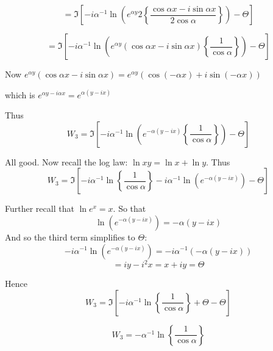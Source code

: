 \documentclass{article}
\begin{document}
  \[ = \Im \left[  
 - i \alpha^{-1} \ln \left(
  e^{\alpha y} 2 \left\{ \frac{\cos \alpha x - i \sin \alpha x }{2 \cos \alpha} \right\} \right) 
  - \Theta  \right] \]

\[ = \Im \left[  
 - i \alpha^{-1} \ln \left(
  e^{\alpha y}( \cos \alpha x - i \sin \alpha x  )  \left\{ \frac{1}{\cos \alpha} \right\} \right) 
  - \Theta  \right] \]

Now $ e^{\alpha y}( \cos \alpha x - i \sin \alpha x  ) = 
e^{\alpha y}( \cos(- \alpha x) + i \sin(- \alpha x)  )$ 

which is $e^{\alpha y - i \alpha x} = e^{ \alpha (y - ix)}$

Thus
\[ W_{3} = \Im \left[  
 - i \alpha^{-1} \ln \left(
  e^{ - \alpha (y - ix)}  \left\{ \frac{1}{\cos \alpha} \right\} \right) 
  - \Theta  \right] \]
  
All good.  Now recall the log law: $\ln xy = \ln x + \ln y$.  Thus
\[ W_{3} = \Im \left[  
  - i \alpha^{-1} \ln  \left\{ \frac{1}{\cos \alpha} \right\} 
- i \alpha^{-1} \ln \left( e^{ - \alpha (y - ix)} \right) 
  - \Theta  \right] \]

Further recall that $\ln e^{x} = x$. So that
\[ \ln \left( e^{ - \alpha (y - ix)} \right) = - \alpha (y - ix) \]  
And so the third term simplifies to $\Theta$:
\[ - i \alpha^{-1} \ln \left( e^{ - \alpha (y - ix)} \right) 
 = - i \alpha^{-1} (- \alpha (y - ix)) \]
\[ = iy - i^{2}x = x + iy = \Theta \]
  
Hence
  \[ W_{3} = \Im \left[  
  - i \alpha^{-1} \ln  \left\{ \frac{1}{\cos \alpha} \right\} 
 + \Theta 
  - \Theta  \right] \]
  
   \[ W_{3} = - \alpha^{-1} \ln  \left\{ \frac{1}{\cos \alpha} \right\} \]
\end{document}
